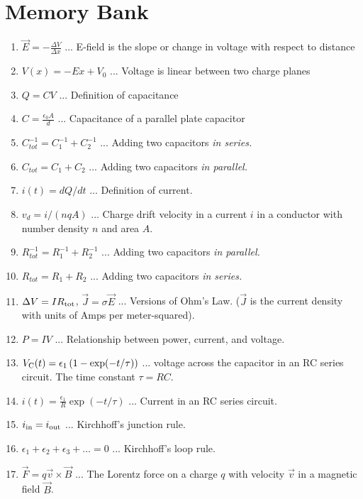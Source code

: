 \documentclass[10pt]{article}
\begin{document}
\maketitle

\section{Memory Bank}

\begin{enumerate}
\item $\vec{E} = -\frac{\Delta V}{\Delta x}$ ... E-field is the slope or change in voltage with respect to distance
\item $V(x) = -E x + V_0$ ... Voltage is linear between two charge planes
\item $Q = CV$ ... Definition of capacitance
\item $C = \frac{\epsilon_0 A}{d}$ ... Capacitance of a parallel plate capacitor
\item $C_{tot}^{-1} = C_1^{-1} + C_2^{-1}$ ... Adding two capacitors \textit{in series.}
\item $C_{tot} = C_1 + C_2$ ... Adding two capacitors \textit{in parallel.}
\item $i(t) = dQ/dt$ ... Definition of current.
\item $v_d = i/(nqA)$ ... Charge drift velocity in a current $i$ in a conductor with number density $n$ and area $A$.
\item $R_{tot}^{-1} = R_1^{-1} + R_2^{-1}$ ... Adding two capacitors \textit{in parallel.}
\item $R_{tot} = R_1 + R_2$ ... Adding two capacitors \textit{in series.}
\item $\Delta V = I R_{\rm tot}$, $\vec{J} = \sigma \vec{E}$ ... Versions of Ohm's Law. ($\vec{J}$ is the current density with units of Amps per meter-squared).
\item $P = I V$ ... Relationship between power, current, and voltage.
\item $V_{\rm C}(t) = \epsilon_1 \left(1 - \exp(-t/\tau)\right)$ ... voltage across the capacitor in an RC series circuit.  The time constant $\tau = RC$.
\item $i(t) = \frac{\epsilon_1}{R} \exp(-t/\tau)$ ... Current in an RC series circuit.
\item $i_{\rm in} = i_{\rm out}$ ... Kirchhoff's junction rule.
\item $\epsilon_1 + \epsilon_2 + \epsilon_3 + ... = 0$ ... Kirchhoff's loop rule.
\item $\vec{F} = q\vec{v} \times \vec{B}$ ... The Lorentz force on a charge $q$ with velocity $\vec{v}$ in a magnetic field $\vec{B}$.

\end{enumerate}
\end{document}
